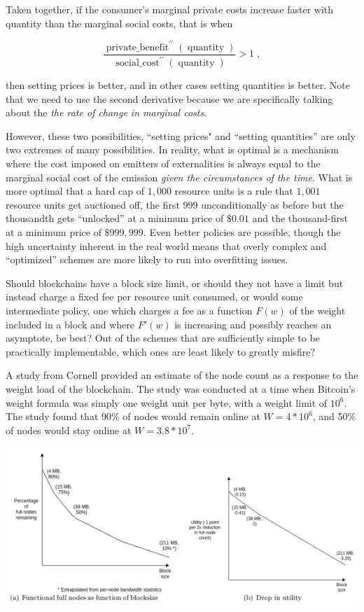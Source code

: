 \documentclass[12pt, final]{article}
\newcommand{\fname}[1]{ \operatorname{ #1 } }
\newcommand{\opname}[1]{ \operatorname{ #1 } }
\begin{document}
Taken together, if the consumer's marginal private costs increase faster with quantity than the marginal social costs, that is when

\begin{equation}
\frac{ \fname{private\_benefit}^{\prime \prime}( \opname{quantity} ) }{ \fname{social\_cost}^{\prime \prime}( \opname{quantity}) }  > 1 \; ,
\end{equation}

then setting prices is better, and in other cases setting quantities is better.  Note that we need to use the second derivative because we are specifically talking about the \emph{the rate of change in marginal costs}.

However, these two possibilities, ``setting prices" and ``setting quantities'' are only two extremes of many possibilities. In reality, what is optimal is a mechanism where the cost imposed on emitters of externalities is always equal to the marginal social cost of the emission \emph{given the circumstances of the time}. What is more optimal that a hard cap of $1,000$ resource units is a rule that $1,001$ resource units get auctioned off, the first $999$ unconditionally as before but the thousandth gets ``unlocked'' at a minimum price of $\$0.01$ and the thousand-first at a minimum price of $\$999,999$. Even better policies are possible, though the high uncertainty inherent in the real world means that overly complex and ``optimized'' schemes are more likely to run into overfitting issues.

Should blockchains have a block size limit, or should they not have a limit but instead charge a fixed fee per resource unit consumed, or would some intermediate policy, one which charges a fee as a function $F(w)$ of the weight included in a block and where $F'(w)$ is increasing and possibly reaches an asymptote, be best? Out of the schemes that are sufficiently simple to be practically implementable, which ones are least likely to greatly misfire?

A study from Cornell\cite{cornell} provided an estimate of the node count as a response to the weight load of the blockchain. The study was conducted at a time when Bitcoin's weight formula was simply one weight unit per byte, with a weight limit of $10^6$. The study found that 90\% of nodes would remain online at $W = 4*10^6$, and 50\% of nodes would stay online at $W = 3.8 * 10^7$.

	\includegraphics[width=5.5in]{blocksize_fullnodes.png}
\end{document}
